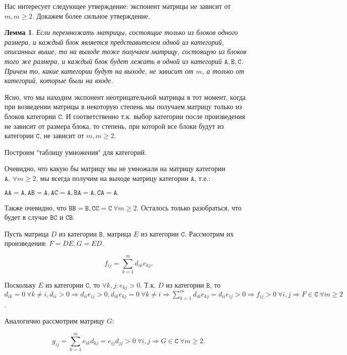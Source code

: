 \documentclass[a4paper,12pt]{report}
\theoremstyle{plain} %
\newtheorem{Lemma}{Лемма}[chapter]
\theoremstyle{definition}
\theoremstyle{remark}
\begin{document}
\begin{large}
Нас интересует следующее утверждение: экспонент матрицы не зависит от $m, m \geq 2$. Докажем более сильное утверждение.

\begin{Lemma}
Если перемножать матрицы, состоящие только из блоков одного размера, и каждый блок является представителем одной из категорий, описанных выше, то на выходе тоже получаем матрицу, состоящую из блоков того же размера, и каждый блок будет лежать в одной из категорий $\texttt{A},\texttt{B},\texttt{C}$. Причем то, какие категории будут на выходе, не зависит от $m$, а только от категорий, которые были на входе.
\end{Lemma}
Ясно, что мы находим экспонент неотрицательной матрицы в тот момент, когда при возведении матрицы в некоторую степень мы получаем матрицу только из блоков категории $\texttt{C}$. И соответственно т.к. выбор категории после произведения не зависит от размера блока, то степень, при которой все блоки будут из категории $\texttt{C}$, не зависит от $m, m \geq 2$.

Построим "таблицу умножения" для категорий.

Очевидно, что какую бы матрицу мы не умножали на матрицу категории $\texttt{A}, ~\forall m \geq 2$, мы всегда получим на выходе матрицу категории $\texttt{A}$, т.е.:

$\texttt{A}\texttt{A} = \texttt{A}, \texttt{A}\texttt{B} = \texttt{A}, \texttt{A}\texttt{C} = \texttt{A}, \texttt{B}\texttt{A} = \texttt{A}, \texttt{C}\texttt{A} = \texttt{A}.$

Также очевидно, что $\texttt{B}\texttt{B} = \texttt{B}, \texttt{C}\texttt{C} = \texttt{C} ~\forall m \geq 2$. Осталось только разобраться, что будет в случае $\texttt{B}\texttt{C}$ и $\texttt{C}\texttt{B}$.

Пусть матрица $D$ из категории $\texttt{B}$, матрица $E$ из категории $\texttt{C}$. Рассмотрим их произведения: $F = DE, G = ED$.

$$f_{ij} = \sum_{k=1}^m d_{ik}e_{kj}.$$

Поскольку $E$ из категории $\texttt{C}$, то $\forall k,j: e_{kj} > 0$. Т.к. $D$ из категории $\texttt{B}$, то $d_{ik} = 0~ \forall k \neq i, d_{ii} > 0 \Rightarrow d_{ii}e_{ij} > 0, d_{ik}e_{kj} = 0~ \forall k \neq i \Rightarrow \sum_{k=1}^m d_{ik}e_{kj} = d_{ii}e_{ij} > 0 \Rightarrow f_{ij} > 0~ \forall i,j \Rightarrow F \in \texttt{C} ~\forall m \geq 2$.

Аналогично рассмотрим матрицу $G$:

$$g_{ij} = \sum_{k=1}^m e_{ik}d_{kj} = e_{ij}d_{jj} > 0 ~\forall i,j \Rightarrow G \in \texttt{C} ~\forall m \geq 2.$$


\end{large}
\end{document}

